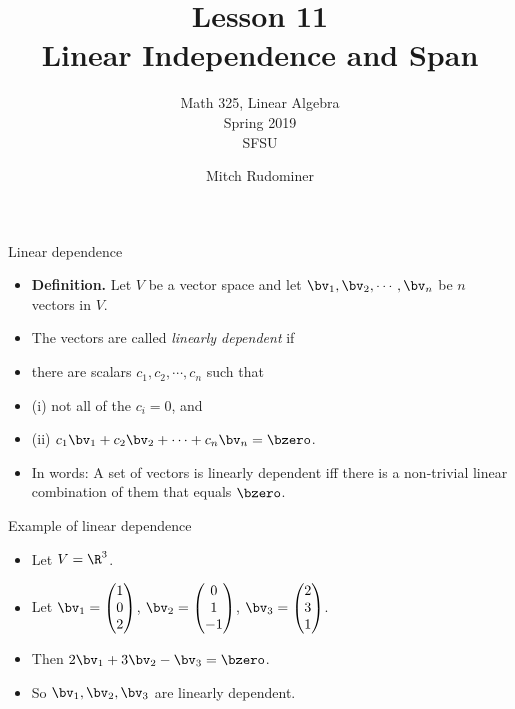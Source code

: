 \documentclass{beamer}
\title{Lesson 11 \\ Linear Independence and Span}
\subtitle{Math 325, Linear Algebra \\ Spring 2019 \\ SFSU}
\author{Mitch Rudominer}
\date{}
\begin{document}
\begin{frame}
  \titlepage
\end{frame}

\begin{frame}{Linear dependence}

\begin{itemize}
\item \textbf{Definition.} Let $V$ be a vector space and let $\bv_1,\bv_2,\cdots,\bv_n$ be $n$ vectors in $V$.
\item The vectors are called \emph{linearly dependent} if
\item there are scalars $c_1,c_2,\cdots,c_n$ such that
\item (i) not all of the $c_i = 0$, and
\item (ii) $c_1 \bv_1 + c_2 \bv_2 + \cdots + c_n\bv_n = \bzero$.
\item In words: A set of vectors is linearly dependent iff there is a non-trivial linear combination
of them that equals $\bzero$.
\end{itemize}

\end{frame}

\begin{frame}{Example of linear dependence}

\begin{itemize}
\item Let $V = \R^3$.
\item Let $\bv_1 =
\begin{pmatrix}
1 \\ 0 \\ 2
\end{pmatrix}
$,
$\bv_2 =
\begin{pmatrix}
0 \\ 1 \\ -1
\end{pmatrix}
$,
$\bv_3 =
\begin{pmatrix}
2 \\ 3 \\ 1
\end{pmatrix}
$.

\item Then $2\bv_1+3\bv_2 - \bv_3 = \bzero$.
\item So $\bv_1, \bv_2, \bv_3$ are linearly dependent.
\end{itemize}

\end{frame}
\end{document}
